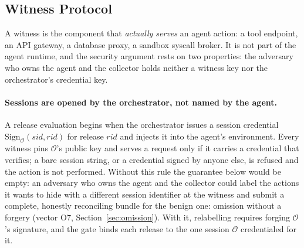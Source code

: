\documentclass[letterpaper,10pt,twocolumn]{article}
\theoremstyle{definition}
\begin{document}
\subsection{Witness Protocol}\label{sec:witness}
A witness is the component that \emph{actually serves} an agent action: a tool endpoint, an API gateway, a database proxy, a sandbox syscall broker. It is not part of the agent runtime, and the security argument rests on two properties: the adversary who owns the agent and the collector holds neither a witness key nor the orchestrator's credential key.

\paragraph{Sessions are opened by the orchestrator, not named by the agent.} A release evaluation begins when the orchestrator issues a session credential $\mathrm{Sign}_{\mathcal{O}}(\mathit{sid}, \mathit{rid})$ for release $\mathit{rid}$ and injects it into the agent's environment. Every witness pins $\mathcal{O}$'s public key and serves a request only if it carries a credential that verifies; a bare session string, or a credential signed by anyone else, is refused and the action is not performed. Without this rule the guarantee below would be empty: an adversary who owns the agent and the collector could label the actions it wants to hide with a different session identifier at the witness and submit a complete, honestly reconciling bundle for the benign one: omission without a forgery (vector O7, Section~\ref{sec:omission}). With it, relabelling requires forging $\mathcal{O}$'s signature, and the gate binds each release to the one session $\mathcal{O}$ credentialed for it.
\end{document}
